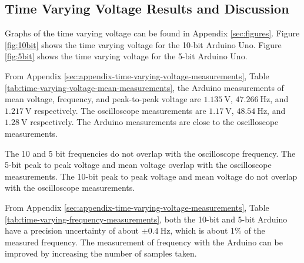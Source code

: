 \subsection{Time Varying Voltage Results and Discussion}
\noindent Graphs of the time varying voltage can be found in Appendix \ref{sec:figures}. Figure \ref{fig:10bit} shows the time varying voltage for the 10-bit Arduino Uno. 
Figure \ref{fig:5bit} shows the time varying voltage for the 5-bit Arduino Uno. 

From Appendix \ref{sec:appendix-time-varying-voltage-measurements}, Table \ref{tab:time-varying-voltage-mean-measurements},
the Arduino measurements of mean voltage, frequency, and peak-to-peak voltage are $\qty{1.135}{\volt}$, $\qty{47.266}{\hertz}$, and $\qty{1.217}{\volt}$ respectively.
The oscilloscope measurements are $\qty{1.17}{\volt}$, $\qty{48.54}{\hertz}$, and $\qty{1.28}{\volt}$ respectively. The Arduino measurements are close 
to the oscilloscope measurements. 

The 10 and 5 bit frequencies do not overlap with the oscilloscope frequency. The 5-bit peak to peak voltage and mean voltage overlap with the oscilloscope measurements.
The 10-bit peak to peak voltage and mean voltage do not overlap with the oscilloscope measurements.

From Appendix \ref{sec:appendix-time-varying-voltage-measurements}, Table \ref{tab:time-varying-frequency-measurements}, both the 10-bit 
and 5-bit Arduino have a precision uncertainty of about $\pm\qty{0.4}{\hertz}$, which is about 1\% of the measured frequency. 
The measurement of frequency with the Arduino can be improved by increasing the number of samples taken.

